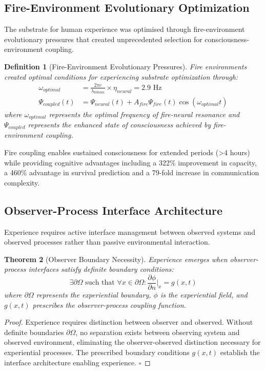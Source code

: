 \documentclass{article}
\newtheorem{theorem}{Theorem}[section]
\newtheorem{definition}[theorem]{Definition}
\begin{document}
\subsection{Fire-Environment Evolutionary Optimization}

The substrate for human experience was optimised through fire-environment evolutionary pressures that created unprecedented selection for consciousness-environment coupling.

\begin{definition}[Fire-Environment Evolutionary Pressures]
Fire environments created optimal conditions for experiencing substrate optimization through:
\begin{align}
\omega_{optimal} &= \frac{2\pi c}{\lambda_{650nm}} \times \eta_{neural} = 2.9 \text{ Hz} \\
\Psi_{coupled}(t) &= \Psi_{neural}(t) + A_{fire}\Psi_{fire}(t)\cos(\omega_{optimal}t)
\end{align}
where $\omega_{optimal}$ represents the optimal frequency of fire-neural resonance and $\Psi_{coupled}$ represents the enhanced state of consciousness achieved by fire-environment coupling.
\end{definition}

Fire coupling enables sustained consciousness for extended periods (>4 hours) while providing cognitive advantages including a 322\% improvement in capacity, a 460\% advantage in survival prediction and a 79-fold increase in communication complexity.

\subsection{Observer-Process Interface Architecture}

Experience requires active interface management between observed systems and observed processes rather than passive environmental interaction.

\begin{theorem}[Observer Boundary Necessity]
Experience emerges when observer-process interfaces satisfy definite boundary conditions:
$$\exists \partial \Omega \text{ such that } \forall x \in \partial \Omega : \frac{\partial \phi}{\partial n}\bigg|_x = g(x,t)$$
where $\partial \Omega$ represents the experiential boundary, $\phi$ is the experiential field, and $g(x,t)$ prescribes the observer-process coupling function.
\end{theorem}

\begin{proof}
Experience requires distinction between observer and observed. Without definite boundaries $\partial \Omega$, no separation exists between observing system and observed environment, eliminating the observer-observed distinction necessary for experiential processes. The prescribed boundary conditions $g(x,t)$ establish the interface architecture enabling experience. $\square$
\end{proof}
\end{document}
